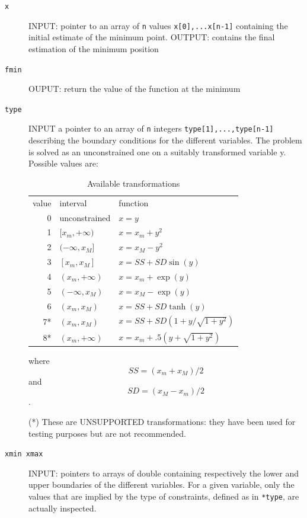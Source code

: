 \documentclass[11pt]{article}
\begin{document}
\begin{description}
\item[\texttt{x}] INPUT: pointer to an array of \texttt{n} values \texttt{x[0],...x[n-1]}
       containing the initial estimate of the minimum point. OUTPUT:
       contains the final estimation of the minimum position
\item[\texttt{fmin}] OUPUT: return the value of the function at the minimum
\item[\texttt{type}] INPUT a pointer to an array of \texttt{n} integers
            \texttt{type[1],...,type[n-1]} describing the boundary conditions
            for the different variables. The problem is solved as an
            unconstrained one on a suitably transformed variable
            y. Possible values are:

\begin{table}[htb]
\caption{Available transformations} 
\begin{center}
\begin{tabular}{rll}
 value  &  interval           &  function                      \\
     0  &  unconstrained      &  $x=y$                         \\
     1  &  $[x_m,+\infty )$   &  $x=x_m+y^2$                   \\
     2  &  $( -\infty,x_M ]$  &  $x=x_M-y^2$                   \\
     3  &  $[ x_m,x_M ]$      &  $x=SS+SD \sin(y)$             \\
     4  &  $( x_m,+\infty )$  &  $x=x_m+\exp(y)$               \\
     5  &  $( -\infty,x_M )$  &  $x=x_M-\exp(y)$               \\
     6  &  $( x_m,x_M )$      &  $x=SS+SD \tanh(y)$            \\
    7*  &  $( x_m,x_M )$      &  $x=SS+SD (1+y/\sqrt{1+y^2})$  \\
    8*  &  $( x_m,+\infty )$  &  $x=x_m+.5 (y+\sqrt{1+y^2})$   \\
\end{tabular}
\end{center}
\end{table}


            where $$SS=(x_m+x_M)/2$$ and $$SD=(x_M-x_m)/2$$.

            (*) These are UNSUPPORTED transformations: they have been
            used for testing purposes but are not recommended.
\item[\texttt{xmin xmax}] INPUT: pointers to arrays of double containing
                 respectively the lower and upper boundaries of the
                 different variables. For a given variable, only the
                 values that are implied by the type of constraints,
                 defined as in \texttt{*type}, are actually inspected.
\end{description}
\end{document}
